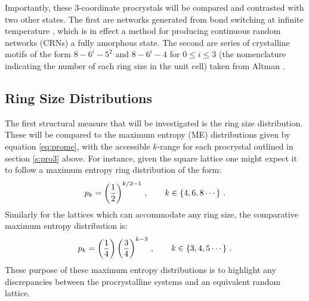 Importantly, these 3\--coordinate procrystals will be compared and contrasted with two other states.
The first are networks generated from bond switching at infinite temperature , which is in effect a method for producing continuous random networks (CRNs) \ie{} a fully amorphous state.
The second are series of crystalline motifs of the form $8-6^i-5^2$ and $8-6^i-4$ for $0\leq i\leq3$ (the nomenclature indicating the number of each ring size in the unit cell) taken from Altman \etal{} \cite{Malashevich2016}.

\subsection{Ring Size Distributions}

The first structural measure that will be investigated is the ring size distribution.
These will be compared to the maximum entropy (ME) distributions given by equation \ref{eq:prome}, with the accessible $k$\--range for each procrystal outlined in section \ref{s:pro3} above. 
For instance, given the square lattice one might expect it to follow a maximum entropy ring distribution of the form:
\begin{equation}
	p_k = \left(\frac{1}{2}\right)^{k/2-1}\,, \qquad k\in\left\{4,6,8\cdots\right\}\,.
\end{equation}
Similarly for the lattices which can accommodate any ring size, the comparative maximum entropy distribution is:
\begin{equation}
	p_k = \left(\frac{1}{4}\right)\left(\frac{3}{4}\right)^{k-3}\,, \qquad k\in\left\{3,4,5\cdots\right\}\,.
\end{equation}
These purpose of these maximum entropy distributions is to highlight any discrepancies between the procrystalline systems and an equivalent random lattice.

